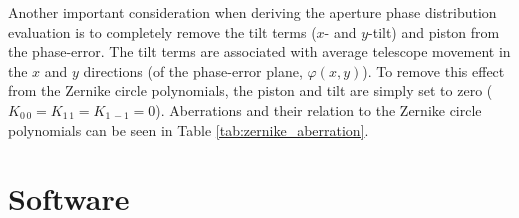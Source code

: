 \documentclass[
    ]
    {aa}
\begin{document}


    Another important consideration when deriving the aperture phase distribution evaluation is to completely remove the tilt terms ($x$- and $y$-tilt) and piston from the phase-error. The tilt terms are associated with average telescope movement in the $x$ and $y$ directions (of the phase-error plane, $\varphi(x, y)$). To remove this effect from the Zernike circle polynomials, the piston and tilt are simply set to zero ($K_{0\,0}=K_{1\,1} = K_{1\,-1}=0$). Aberrations and their relation to the Zernike circle polynomials can be seen in Table \ref{tab:zernike_aberration}.

    \section{Software} 
    \label{sec:software}
\end{document}
